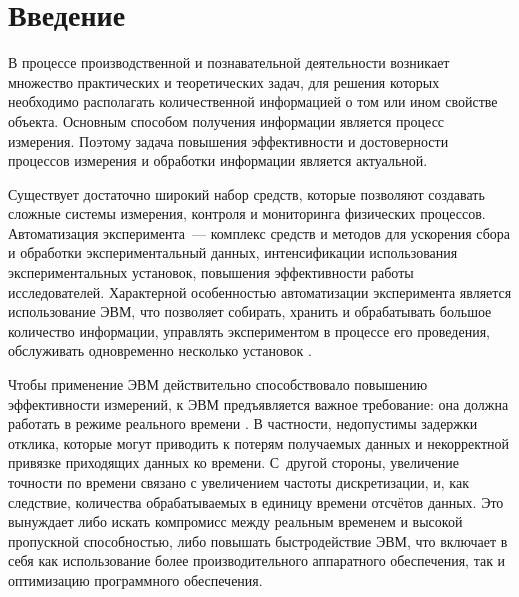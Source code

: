 \documentclass[a4paper, 14pt]{extarticle}
\author{\theauthor, КубГУ}
\title{\thetitle}
\newcommand\sectiontoc[1]{\section*{#1}\addcontentsline{toc}{section}{#1}}
\begin{document}

  \maketitle


    \tableofcontents

  \sectiontoc{Введение}\label{sec:intro}

  В процессе производственной и познавательной деятельности возникает множество практических и
  теоретических задач, для решения которых необходимо располагать количественной информацией о том
  или ином свойстве объекта. Основным способом получения информации является процесс измерения.
  Поэтому задача повышения эффективности и достоверности процессов измерения и обработки информации
  является актуальной.

  Существует достаточно широкий набор средств, которые позволяют создавать сложные системы
  измерения, контроля и мониторинга физических процессов. Автоматизация эксперимента~--- комплекс
  средств и методов для ускорения сбора и обработки экспериментальный данных, интенсификации
  использования экспериментальных установок, повышения эффективности работы исследователей.
  Характерной особенностью автоматизации эксперимента является использование ЭВМ, что позволяет
  собирать, хранить и обрабатывать большое количество информации, управлять экспериментом в процессе
  его проведения, обслуживать одновременно несколько установок \cite{sokolov-auto-measure}.

  Чтобы применение ЭВМ действительно способствовало повышению эффективности измерений, к ЭВМ
  предъявляется важное требование: она должна работать в режиме реального времени
  \cite{tessier-reconfigurable}. В частности, недопустимы задержки отклика, которые могут приводить
  к потерям получаемых данных и некорректной привязке приходящих данных ко времени. С~другой
  стороны, увеличение точности по времени связано с увеличением частоты дискретизации, и, как
  следствие, количества обрабатываемых в единицу времени отсчётов данных. Это вынуждает либо искать
  компромисс между реальным временем и высокой пропускной способностью, либо повышать быстродействие
  ЭВМ, что включает в себя как использование более производительного аппаратного обеспечения, так и
  оптимизацию программного обеспечения.
\end{document}
